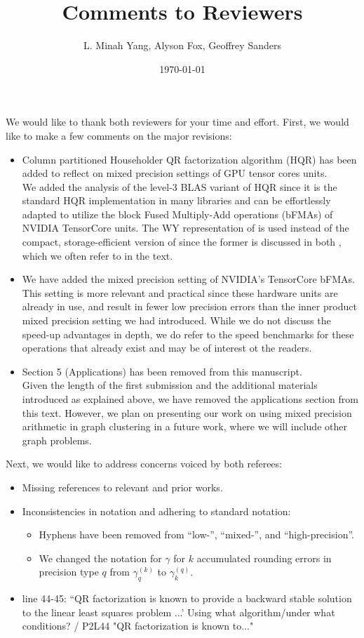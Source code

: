\documentclass[10pt]{article}
\title{Comments to Reviewers}
\author{\small L. Minah Yang, Alyson Fox, Geoffrey Sanders \vspace{-5cm}}
\date{\small \today}
\begin{document}
\maketitle
We would like to thank both reviewers for your time and effort. 
First, we would like to make a few comments on the major revisions:
\begin{itemize}\bfseries
	\item Column partitioned Householder QR factorization algorithm (HQR) has been added to reflect on mixed precision settings of GPU tensor cores units.\\
	{\normalfont We added the analysis of the level-3 BLAS variant of HQR since it is the standard HQR implementation in many libraries and can be effortlessly adapted to utilize the block Fused Multiply-Add operations (bFMAs) of NVIDIA TensorCore units.
	The WY representation of \cite{Bischof1987} is used instead of the compact, storage-efficient version of \cite{Schreiber1989} since the former is discussed in both \cite{golub2013matrix,Higham2002}, which we often refer to in the text.
	}
	\item We have added the mixed precision setting of NVIDIA's TensorCore bFMAs.
	{\normalfont
	This setting is more relevant and practical since these hardware units are already in use, and result in fewer low precision errors than the inner product mixed precision setting we had introduced. 
	While we do not discuss the speed-up advantages in depth, we do refer to the speed benchmarks for these operations that already exist and may be of interest ot the readers.
	}
	\item Section 5 (Applications) has been removed from this manuscript.\\
	{\normalfont 
	Given the length of the first submission and the additional materials introduced as explained above, we have removed the applications section from this text.
	However, we plan on presenting our work on using mixed precision arithmetic in graph clustering in a future work, where we will include other graph problems.
	} 
	
\end{itemize}
Next, we would like to address concerns voiced by both referees:
\begin{itemize}\bfseries
	\item Missing references to relevant and prior works.\\
	{\normalfont
	

    }
	\item Inconsistencies in notation and adhering to standard notation:
	\begin{itemize}
		\item Hyphens have been removed from ``low-'', ``mixed-'', and ``high-precision''.
		\item We changed the notation for $\gamma$ for $k$ accumulated rounding errors in precision type $q$ from $\gamma_{q}^{(k)}$ to $\gamma_{k}^{(q)}$.
	\end{itemize}
	\item line 44-45: ``QR factorization is known to provide a backward stable solution to the linear least squares problem ...' Using what algorithm/under what conditions? / P2L44 "QR factorization is known to..."
\end{itemize}
\end{document}
